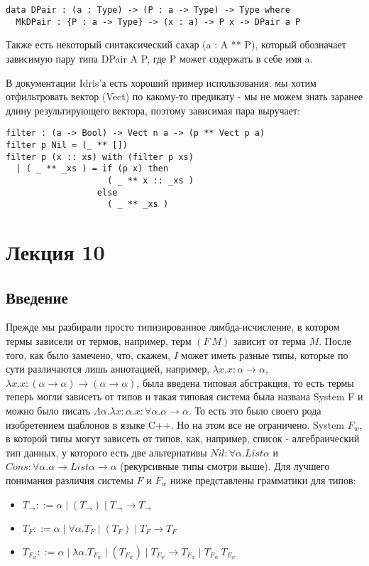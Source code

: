 \begin{verbatim}
data DPair : (a : Type) -> (P : a -> Type) -> Type where
  MkDPair : {P : a -> Type} -> (x : a) -> P x -> DPair a P
\end{verbatim}

Также есть некоторый синтаксический сахар (a : A ** P), который обозначает зависимую пару типа DPair A P, где P может содержать в себе имя a.

В документации Idris'а есть хороший пример использования: мы хотим отфильтровать вектор  (Vect) по какому-то предикату - мы не можем знать заранее длину результирующего вектора, поэтому зависимая пара выручает:

\begin{verbatim}
filter : (a -> Bool) -> Vect n a -> (p ** Vect p a)
filter p Nil = (_ ** [])
filter p (x :: xs) with (filter p xs)
  | ( _ ** _xs ) = if (p x) then
                    ( _ ** x :: _xs )
                  else
                    ( _ ** _xs )
\end{verbatim}


\section{Лекция 10}

\subsection{Введение}

Прежде мы разбирали просто типизированное лямбда-исчисление, в котором термы зависели от термов, например, терм $(F\ M)$ зависит от терма $M$. После того, как было замечено, что, скажем, $I$ может иметь разные типы, которые по сути различаются лишь аннотацией, например, $\lambda x. x : \alpha \rightarrow \alpha$, $\lambda x. x : (\alpha \rightarrow \alpha) \rightarrow (\alpha \rightarrow \alpha)$, была введена типовая абстракция, то есть термы теперь могли зависеть от типов и такая типовая система была названа System F и можно было писать $\Lambda \alpha. \lambda x : \alpha . x : \forall \alpha. \alpha \rightarrow \alpha$. То есть это было своего рода изобретением шаблонов в языке C++. Но на этом все не ограничено. System $F_w$, в которой типы могут зависеть от типов, как, например, список - алгебраический тип данных, у которого есть две альтернативы $Nil : \forall \alpha . List \alpha$ и $Cons : \forall \alpha. \alpha \rightarrow List \alpha \rightarrow \alpha$ (рекурсивные типы смотри выше). Для лучшего понимания различия системы $F$ и $F_w$ ниже представлены грамматики для типов:
\begin{itemize}
    \item $T_\rightarrow ::= \alpha \mid (T_\rightarrow) \mid T_\rightarrow \rightarrow T_\rightarrow$
    \item $T_F ::= \alpha \mid \forall \alpha. T_F \mid (T_F) \mid T_F \rightarrow T_F$
    \item $T_{F_w} ::= \alpha \mid \lambda \alpha. T_{F_w} \mid (T_{F_w}) \mid T_{F_w} \rightarrow T_{F_w} \mid T_{F_w}\ T_{F_w} $
\end{itemize}

